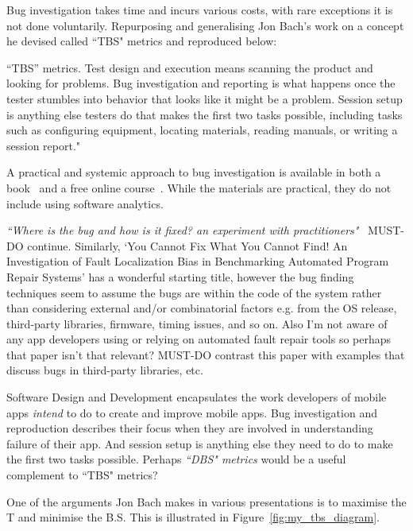 Bug investigation takes time and incurs various costs, with rare exceptions it is not done voluntarily. Repurposing and generalising Jon Bach's work on a concept he devised called ``TBS" metrics and reproduced below:

“TBS” metrics. Test design and execution means scanning the product and looking for problems. Bug investigation and reporting is what happens once the tester stumbles into behavior that looks like it might be a problem. Session setup is anything else testers do that makes the first two tasks possible, including tasks such as configuring equipment, locating materials, reading manuals, or writing a session report."~

A practical and systemic approach to bug investigation is available in both a book~ and a free online course~. While the materials are practical, they do not include using software analytics.

\emph{``Where is the bug and how is it fixed? an experiment with practitioners"}~ MUST-DO continue. Similarly, `You Cannot Fix What You Cannot Find! An Investigation of Fault Localization Bias in Benchmarking Automated Program Repair Systems' has a wonderful starting title, however the bug finding techniques seem to assume the bugs are within the code of the system rather than considering external and/or combinatorial factors e.g. from the OS release, third-party libraries, firmware, timing issues, and so on. Also I'm not aware of any app developers using or relying on automated fault repair tools so perhaps that paper isn't that relevant? MUST-DO contrast this paper with examples that discuss bugs in third-party libraries, etc.~

Software Design and Development encapsulates the work developers of mobile apps \emph{intend} to do to create and improve mobile apps. Bug investigation and reproduction describes their focus when they are involved in understanding failure of their app. And session setup is anything else they need to do to make the first two tasks possible. Perhaps \emph{``DBS" metrics} would be a useful complement to ``TBS" metrics?

One of the arguments Jon Bach makes in various presentations is to maximise the T and minimise the B.S. This is illustrated in Figure~\ref{fig:my_tbs_diagram}.

